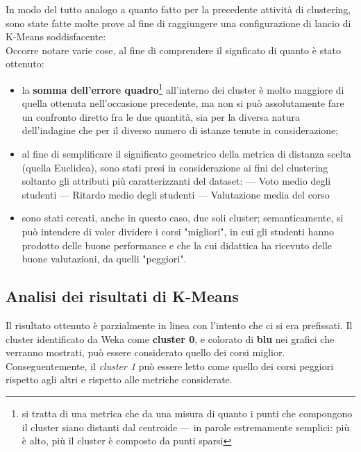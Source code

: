         In modo del tutto analogo a quanto fatto per la precedente attività di clustering, sono state fatte molte prove al fine di raggiungere una configurazione di lancio di K-Means soddisfacente: \\

        

        Occorre notare varie cose, al fine di comprendere il signficato di quanto è stato ottenuto:

        \begin{itemize}
            \item la \textbf{somma dell'errore quadro}\footnote{si tratta di una metrica che da una misura di quanto i punti che compongono il cluster siano distanti dal centroide --- in parole estremamente semplici: più è alto, più il cluster è composto da punti sparsi} all'interno dei cluster è molto maggiore di quella ottenuta nell'occasione precedente, ma non si può assolutamente fare un confronto diretto fra le due quantità, sia per la diversa natura dell'indagine che per il diverso numero di istanze tenute in considerazione;
            \item al fine di semplificare il significato geometrico della metrica di distanza scelta (quella Euclidea), sono stati presi in considerazione ai fini del clustering soltanto gli attributi più caratterizzanti del dataset:
                \subitem --- Voto medio degli studenti
                \subitem --- Ritardo medio degli studenti
                \subitem --- Valutazione media del corso
            \item sono stati cercati, anche in questo caso, due soli cluster; semanticamente, si può intendere di voler dividere i corsi "migliori", in cui gli studenti hanno prodotto delle buone performance e che la cui didattica ha ricevuto delle buone valutazioni, da quelli "peggiori".
        \end{itemize}

    \subsection{Analisi dei risultati di K-Means}

        Il risultato ottenuto è parzialmente in linea con l'intento che ci si era prefissati. Il cluster identificato da Weka come \textbf{cluster 0}, e colorato di \textbf{blu} nei grafici che verranno mostrati, può essere considerato quello dei corsi miglior. Conseguentemente, il \textit{cluster 1} può essere letto come quello dei corsi peggiori rispetto agli altri e rispetto alle metriche considerate. \\

